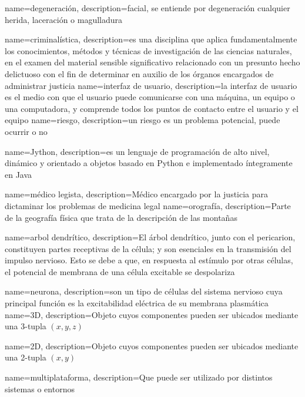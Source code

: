{
	name=degeneración,
	description={facial, se entiende por degeneración cualquier herida, laceración o magulladura} 
}


{
	name=criminalística,
	description={es una disciplina que aplica fundamentalmente los conocimientos, métodos y técnicas de investigación de las ciencias naturales, en el examen del material sensible significativo relacionado con un presunto hecho delictuoso con el fin de determinar en auxilio de los órganos encargados de administrar justicia} 
}
{
	name=interfaz de usuario,
	description={la interfaz de usuario es el medio con que el usuario puede comunicarse con una máquina, un equipo o una computadora, y comprende todos los puntos de contacto entre el usuario y el equipo} 
}
{
	name=riesgo,
	description={un riesgo es un problema potencial, puede ocurrir o no} 
}

{
	name=Jython,
	description={es un lenguaje de programación de alto nivel, dinámico y orientado a objetos basado en Python e implementado íntegramente en Java} 
}



{
	name=médico legista,
	description={Médico encargado por la justicia para dictaminar los problemas de medicina legal} 
}
{
	name=orografía,
	description={Parte de la geografía física que trata de la descripción de las montañas} 
}

{
	name=arbol dendrítico,
	description={El árbol dendrítico, junto con el pericarion, constituyen partes receptivas de la célula; y son esenciales en la transmisión del impulso nervioso. Esto se debe a que, en respuesta al estímulo por otras células, el potencial de membrana de una célula excitable se despolariza} 
}


{
	name=neurona,
	description={son un tipo de células del sistema nervioso cuya principal función es la excitabilidad eléctrica de su membrana plasmática} 
}
{
	name=3D,
	description={Objeto cuyos componentes pueden ser ubicados mediante una 3-tupla $(x,y,z)$} 
}


{
	name=2D,
	description={Objeto cuyos componentes pueden ser ubicados mediante una 2-tupla $(x,y)$} 
}

{
	name=multiplataforma,
	description={Que puede ser utilizado por distintos sistemas o entornos} 
}

